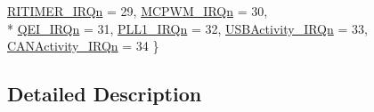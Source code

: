 \begin{DoxyCompactItemize}
\hyperlink{group___c_m_s_i_s__175_x__6_x___i_r_q_ggaaaeafe7bd8401a46d55e8431b6326116a6c4ccf16e191963e48badc499a56cf3a}{R\+I\+T\+I\+M\+E\+R\+\_\+\+I\+R\+Qn} = 29, 
\hyperlink{group___c_m_s_i_s__175_x__6_x___i_r_q_ggaaaeafe7bd8401a46d55e8431b6326116a66a11398b7cc13d7c525945b0a86a2f0}{M\+C\+P\+W\+M\+\_\+\+I\+R\+Qn} = 30, 
\\*
\hyperlink{group___c_m_s_i_s__175_x__6_x___i_r_q_ggaaaeafe7bd8401a46d55e8431b6326116a82471ba65527ad3f3da8af38acb953bf}{Q\+E\+I\+\_\+\+I\+R\+Qn} = 31, 
\hyperlink{group___c_m_s_i_s__175_x__6_x___i_r_q_ggaaaeafe7bd8401a46d55e8431b6326116a0f0e46a33c20be148ef16fe7ed4dcd4b}{P\+L\+L1\+\_\+\+I\+R\+Qn} = 32, 
\hyperlink{group___c_m_s_i_s__175_x__6_x___i_r_q_ggaaaeafe7bd8401a46d55e8431b6326116aa3c495fabd97a50818dc748f738c71e7}{U\+S\+B\+Activity\+\_\+\+I\+R\+Qn} = 33, 
\hyperlink{group___c_m_s_i_s__175_x__6_x___i_r_q_ggaaaeafe7bd8401a46d55e8431b6326116a25ef61f3d4a0d5f2bcf0525702b872b7}{C\+A\+N\+Activity\+\_\+\+I\+R\+Qn} = 34
 \}
\end{DoxyCompactItemize}


\subsection{Detailed Description}


